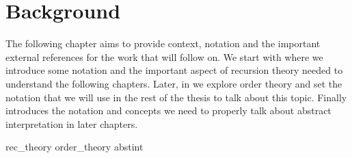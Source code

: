 \chapter{Background}

The following chapter aims to provide context, notation and the
important external references for the work that will follow on.  We
start with  where we introduce some
notation and the important aspect of recursion theory needed to
understand the following chapters.  Later, in
 we explore order theory and set the
notation that we will use in the rest of the thesis to talk about this
topic. Finally  introduces the notation and
concepts we need to properly talk about abstract interpretation in
later chapters.

{rec_theory}
{order_theory}
{abstint}
